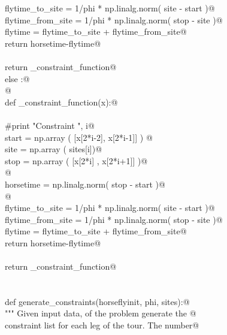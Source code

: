 \documentclass[11.5pt]{report}
\begin{document}
\begin{flushleft}
\begin{list}{}{}
\mbox{}\verb@                flytime_to_site   = 1/phi * np.linalg.norm( site - start )@\\
\mbox{}\verb@                flytime_from_site = 1/phi * np.linalg.norm( stop - site  )@\\
\mbox{}\verb@                flytime           = flytime_to_site + flytime_from_site@\\
\mbox{}\verb@                return horsetime-flytime@\\
\mbox{}\verb@@\\
\mbox{}\verb@            return _constraint_function@\\
\mbox{}\verb@        else :@\\
\mbox{}\verb@          @\\
\mbox{}\verb@            def _constraint_function(x):@\\
\mbox{}\verb@@\\
\mbox{}\verb@               #print "Constraint  ", i@\\
\mbox{}\verb@               start = np.array (  [x[2*i-2], x[2*i-1]]  ) @\\
\mbox{}\verb@               site  = np.array (  sites[i])@\\
\mbox{}\verb@               stop  = np.array (  [x[2*i]  , x[2*i+1]]  )@\\
\mbox{}\verb@            @\\
\mbox{}\verb@               horsetime = np.linalg.norm( stop - start )@\\
\mbox{}\verb@           @\\
\mbox{}\verb@               flytime_to_site   = 1/phi * np.linalg.norm( site - start )@\\
\mbox{}\verb@               flytime_from_site = 1/phi * np.linalg.norm( stop - site  )@\\
\mbox{}\verb@               flytime           = flytime_to_site + flytime_from_site@\\
\mbox{}\verb@               return horsetime-flytime@\\
\mbox{}\verb@@\\
\mbox{}\verb@            return _constraint_function@\\
\mbox{}\verb@@\\
\mbox{}\verb@@\\
\mbox{}\verb@    def generate_constraints(horseflyinit, phi, sites):@\\
\mbox{}\verb@        """ Given input data, of the problem generate the @\\
\mbox{}\verb@        constraint list for each leg of the tour. The number@\\

\end{list}
\end{flushleft}
\end{document}
